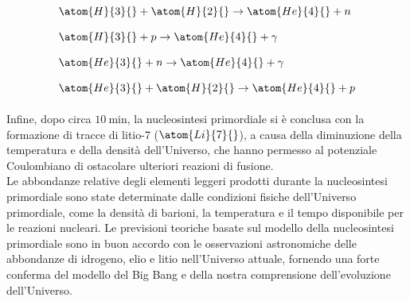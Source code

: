\begin{equation}
    \begin{split}
        &\atom{H}{3}{} + \atom{H}{2}{} \rightarrow \atom{He}{4}{} + n \\[8pt]
        &\atom{H}{3}{} + p \rightarrow \atom{He}{4}{} + \gamma \\[8pt]
        &\atom{He}{3}{} + n \rightarrow \atom{He}{4}{} + \gamma \\[8pt]
        &\atom{He}{3}{} + \atom{H}{2}{} \rightarrow \atom{He}{4}{} + p \\[8pt]
    \end{split}
\end{equation}
Infine, dopo circa $\qty{10}{\minute}$, la nucleosintesi primordiale si è conclusa con la formazione di tracce di litio-7 ($\atom{Li}{7}{}$), a causa della diminuzione della temperatura e della densità dell'Universo, che hanno permesso al potenziale Coulombiano di ostacolare ulteriori reazioni di fusione.\\
Le abbondanze relative degli elementi leggeri prodotti durante la nucleosintesi primordiale sono state determinate dalle condizioni fisiche dell'Universo primordiale, come la densità di barioni, la temperatura e il tempo disponibile per le reazioni nucleari. Le previsioni teoriche basate sul modello della nucleosintesi primordiale sono in buon accordo con le osservazioni astronomiche delle abbondanze di idrogeno, elio e litio nell'Universo attuale, fornendo una forte conferma del modello del Big Bang e della nostra comprensione dell'evoluzione dell'Universo.\\
